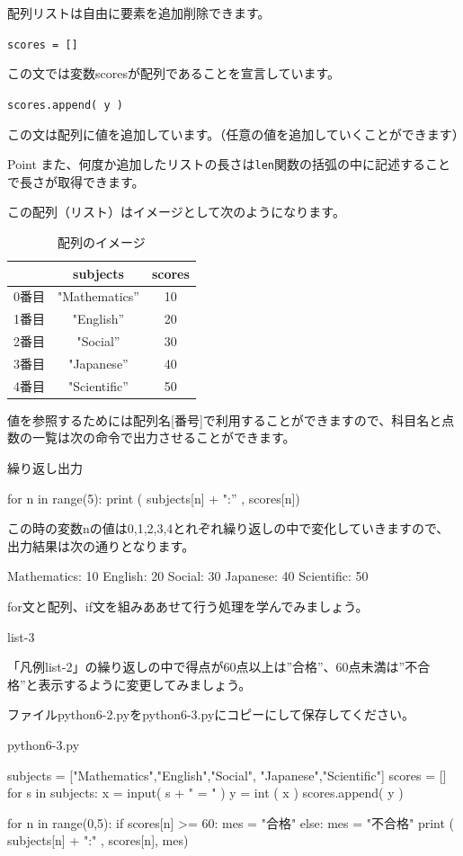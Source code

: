 \documentclass[11pt,a4paper,dvipdfmx,titlepage]{jsreport}
\begin{document}
配列リストは自由に要素を追加削除できます。

{\tt scores = []}

この文では変数scoresが配列であることを宣言しています。

{\tt scores.append( y )}

この文は配列に値を追加しています。（任意の値を追加していくことができます）
\begin{hipoint}{Point}
また、何度か追加したリストの長さは{\tt len}関数の括弧の中に記述することで長さが取得できます。
\end{hipoint}
この配列（リスト）はイメージとして次のようになります。
\newpage
\begin{table}[h]
 \begin{center}
    \caption{配列のイメージ}
\begin{tabular}{|c|c|c|} \hline
      & subjects      & scores \\ \hline \hline
0番目  & "Mathematics” &   10	\\ \hline
1番目  & "English”     &   20 \\ \hline
2番目  & "Social”      &   30 \\ \hline
3番目  & "Japanese”    &   40 \\ \hline
4番目  & "Scientific”  &   50 \\ \hline
\end{tabular}
\end{center}
\end{table}


値を参照するためには配列名[番号]で利用することができますので、科目名と点数の一覧は次の命令で出力させることができます。

\begin{grabox}{繰り返し出力}
\begin{listing}{1}
for n in range(5):
    print ( subjects[n] + ":” , scores[n])
\end{listing}
この時の変数nの値は0,1,2,3,4とれぞれ繰り返しの中で変化していきますので、
出力結果は次の通りとなります。
\begin{listing}{1}
Mathematics: 10
English: 20
Social: 30
Japanese: 40
Scientific: 50
\end{listing}
\end{grabox}
for文と配列、if文を組みああせて行う処理を学んでみましょう。
\begin{pabox}{list-3}

「凡例list-2」の繰り返しの中で得点が60点以上は”合格”、60点未満は”不合格”と表示するように変更してみましょう。

ファイルpython6-2.pyをpython6-3.pyにコピーにして保存してください。
\begin{legbox}{python6-3.py}
\begin{listing}{1}
subjects = ["Mathematics","English","Social",
    "Japanese","Scientific"]
scores = [] 
for s in subjects:
    x = input( s + " = " )
    y = int ( x )
    scores.append( y )

for n in range(0,5):
    if scores[n] >= 60:
        mes = "合格"
    else:
        mes = "不合格"
    print ( subjects[n] + ":" , scores[n], mes)
\end{listing}
\end{legbox}
\end{pabox}
\end{document}
